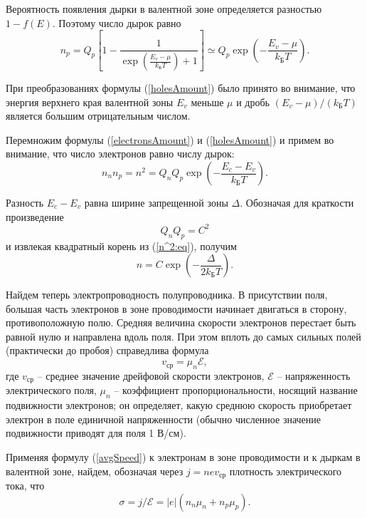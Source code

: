 \documentclass[a4paper, 12pt]{article}
\begin{document}
	Вероятность появления дырки в валентной зоне определяется разностью $1-f(E)$. Поэтому число дырок равно
	\begin{equation}
		n_p=Q_p\left[1-\frac{1}{\exp{\left(\frac{E_v-\mu}{k_{\text{Б}}T}\right)+1}}\right]\simeq Q_p\exp{\left(-\frac{E_v-\mu}{k_{\text{Б}}T}\right)}.
		\label{holesAmount}
	\end{equation}

	При преобразованиях формулы (\ref{holesAmount}) было принято во внимание, что энергия верхнего края валентной зоны $E_v$ меньше $\mu$ и дробь $(E_v-\mu)/(k_{\text{Б}}T)$ является большим отрицательным числом.

	Перемножим формулы (\ref{electronsAmount}) и (\ref{holesAmount}) и примем во внимание, что число электронов равно числу дырок:
	\begin{equation}
		n_nn_p=n^2=Q_nQ_p\exp{\left(-\frac{E_c-E_v}{k_{\text{Б}}T}\right)}.
		\label{n^2:eq}
	\end{equation}

	Разность $E_c-E_v$ равна ширине запрещенной зоны $\Delta$. Обозначая для краткости произведение
	\begin{equation}
		Q_nQ_p=C^2
	\end{equation}
	и извлекая квадратный корень из (\ref{n^2:eq}), получим
	\begin{equation}
		n=C\exp{\left(-\frac{\Delta}{2k_{\text{Б}}T}\right)}.
		\label{eq:n}
	\end{equation}

	Найдем теперь электропроводность полупроводника. В присутствии поля, большая часть электронов в зоне проводимости начинает двигаться в сторону, противоположную полю. Средняя величина скорости электронов перестает быть равной нулю и направлена вдоль поля. При этом вплоть до самых сильных полей (практически до пробоя) справедлива формула
	\begin{equation}
		v_{\text{ср}}=\mu_n\mathscr{E},
		\label{avgSpeed}
	\end{equation}
	где $v_{\text{ср}}$ -- среднее значение дрейфовой скорости электронов, $\mathscr{E}$ -- напряженность электрического поля, $\mu_n$ -- коэффициент пропорциональности, носящий название подвижности электронов; он определяет, какую среднюю скорость приобретает электрон в поле единичной напряженности (обычно численное значение подвижности приводят для поля 1 В/см).

	Применяя формулу (\ref{avgSpeed}) к электронам в зоне проводимости и к дыркам в валентной зоне, найдем, обозначая через $j=nev_{\text{ср}}$ плотность электрического тока, что
	\begin{equation}
		\sigma=j/\mathscr{E}=|e|(n_n\mu_n+n_p\mu_p).
		\label{sigmaDefenition}
	\end{equation}
	
\end{document}
